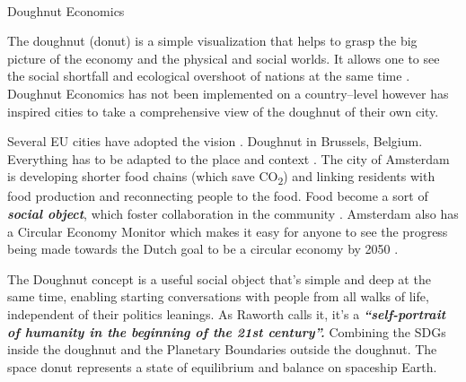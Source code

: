 \documentclass[
  letterpaper,
  DIV=11,
  numbers=noendperiod]{scrartcl}
\makeatletter
\let\oldparagraph\paragraph
\renewcommand{\paragraph}{
    \@ifstar
      \xxxParagraphStar
      \xxxParagraphNoStar
  }
\newcommand{\xxxParagraphStar}[1]{\oldparagraph*{#1}\mbox{}}
\newcommand{\xxxParagraphNoStar}[1]{\oldparagraph{#1}\mbox{}}
\makeatother
\begin{document}
\paragraph{Doughnut Economics}\label{doughnut-economics}

The doughnut (donut) is a simple visualization that helps to grasp the
big picture of the economy and the physical and social worlds. It allows
one to see the social shortfall and ecological overshoot of nations at
the same time \citep{fanningSocialShortfallEcological2021}. Doughnut
Economics has not been implemented on a country--level however has
inspired cities to take a comprehensive view of the doughnut of their
own city.

Several EU cities have adopted the vision
\citep{teicherDoughnutEconomicsHas2021}. Doughnut in Brussels, Belgium.
Everything has to be adapted to the place and context
\citep{oikosdenktankWebinarDoughnutEconomics2021, brusselsdonutHomeBrusselsDonut2022}.
The city of Amsterdam is developing shorter food chains (which save
CO\textsubscript{2}) and linking residents with food production and
reconnecting people to the food. Food become a sort of
\textbf{\emph{social object}}, which foster collaboration in the
community \citep{circleeconomyKeynoteIlektraKouloumpi2021}. Amsterdam
also has a Circular Economy Monitor which makes it easy for anyone to
see the progress being made towards the Dutch goal to be a circular
economy by 2050
\citep{waterstaatCircularDutchEconomy2019, gemeenteamsterdamCircularEconomyMonitor2022}.

The Doughnut concept is a useful social object that's simple and deep at
the same time, enabling starting conversations with people from all
walks of life, independent of their politics leanings. As Raworth calls
it, it's a \textbf{\emph{``self-portrait of humanity in the beginning of
the 21st century''.}} Combining the SDGs inside the doughnut and the
Planetary Boundaries outside the doughnut. The space donut represents a
state of equilibrium and balance on spaceship Earth.
\end{document}
